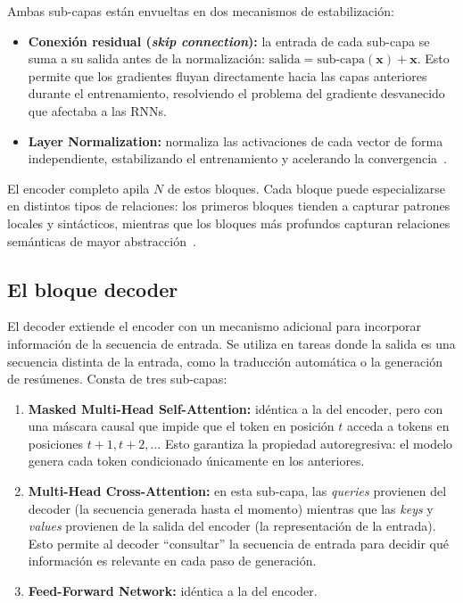 Ambas sub-capas están envueltas en dos mecanismos de estabilización:

\begin{itemize}
    \item \textbf{Conexión residual (\textit{skip connection}):} la entrada
    de cada sub-capa se suma a su salida antes de la normalización:
    $\text{salida} = \text{sub-capa}(\bm{x}) + \bm{x}$. Esto permite que
    los gradientes fluyan directamente hacia las capas anteriores durante
    el entrenamiento, resolviendo el problema del gradiente desvanecido
    que afectaba a las RNNs.

    \item \textbf{Layer Normalization:} normaliza las activaciones de cada
    vector de forma independiente, estabilizando el entrenamiento y
    acelerando la convergencia~\cite{goodfellow2016deeplearning}.
\end{itemize}



El encoder completo apila $N$ de estos bloques. Cada bloque puede
especializarse en distintos tipos de relaciones: los primeros bloques
tienden a capturar patrones locales y sintácticos, mientras que los
bloques más profundos capturan relaciones semánticas de mayor
abstracción~\cite{vaswani2017attention}.

\subsection{El bloque decoder}
\label{subsec:bloque_decoder}

El decoder extiende el encoder con un mecanismo adicional para incorporar
información de la secuencia de entrada. Se utiliza en tareas donde la
salida es una secuencia distinta de la entrada, como la traducción
automática o la generación de resúmenes. Consta de tres sub-capas:

\begin{enumerate}
    \item \textbf{Masked Multi-Head Self-Attention:} idéntica a la del
    encoder, pero con una máscara causal que impide que el token en
    posición $t$ acceda a tokens en posiciones $t+1, t+2, \ldots$
    Esto garantiza la propiedad autoregresiva: el modelo genera cada
    token condicionado únicamente en los anteriores.

    \item \textbf{Multi-Head Cross-Attention:} en esta sub-capa, las
    \textit{queries} provienen del decoder (la secuencia generada hasta
    el momento) mientras que las \textit{keys} y \textit{values} provienen
    de la salida del encoder (la representación de la entrada). Esto
    permite al decoder ``consultar'' la secuencia de entrada para decidir
    qué información es relevante en cada paso de generación.

    \item \textbf{Feed-Forward Network:} idéntica a la del encoder.
\end{enumerate}

